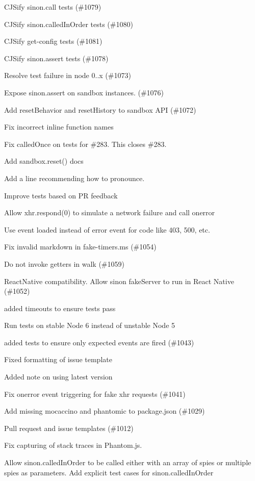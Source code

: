 \begin{DoxyItemize}
\item C\+J\+Sify sinon.\+call tests (\#1079)
\item C\+J\+Sify sinon.\+called\+In\+Order tests (\#1080)
\item C\+J\+Sify get-\/config tests (\#1081)
\item C\+J\+Sify sinon.\+assert tests (\#1078)
\item Resolve test failure in node 0..\+x (\#1073)
\item Expose {\ttfamily sinon.\+assert} on sandbox instances. (\#1076)
\item Add reset\+Behavior and reset\+History to sandbox A\+PI (\#1072)
\item Fix incorrect inline function names
\item Fix called\+Once on tests for \#283. This closes \#283.
\item Add sandbox.\+reset() docs
\item Add a line recommending how to pronounce.
\item Improve tests based on PR feedback
\item Allow xhr.\+respond(0) to simulate a network failure and call onerror
\item Use event loaded instead of error event for code like 403, 500, etc.
\item Fix invalid markdown in fake-\/timers.\+ms (\#1054)
\item Do not invoke getters in walk (\#1059)
\item React\+Native compatibility. Allow sinon fake\+Server to run in React Native (\#1052)
\item added timeouts to ensure tests pass
\item Run tests on stable Node 6 instead of unstable Node 5
\item added tests to ensure only expected events are fired (\#1043)
\item Fixed formatting of issue template
\item Added note on using latest version
\item Fix onerror event triggering for fake xhr requests (\#1041)
\item Add missing mocaccino and phantomic to package.\+json (\#1029)
\item Pull request and issue templates (\#1012)
\item Fix capturing of stack traces in Phantom.\+js.
\item Allow sinon.\+called\+In\+Order to be called either with an array of spies or multiple spies as parameters. Add explicit test cases for sinon.\+called\+In\+Order

\end{DoxyItemize}
